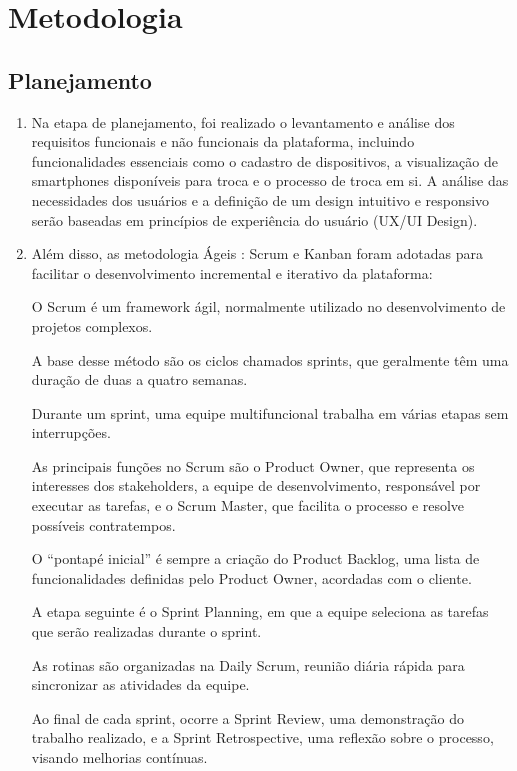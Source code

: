 \chapter{Metodologia}

\section{Planejamento}
\begin{enumerate}
    \item Na etapa de planejamento, foi realizado o levantamento e análise dos requisitos
    funcionais e não funcionais da plataforma, incluindo funcionalidades essenciais como
    o cadastro de dispositivos, a visualização de smartphones disponíveis para troca e o
    processo de troca em si. A análise das necessidades dos usuários e a definição de
    um design intuitivo e responsivo serão baseadas em princípios de experiência do
    usuário (UX/UI Design).

    \item Além disso, as metodologia Ágeis : Scrum e Kanban foram adotadas para facilitar o
    desenvolvimento incremental e iterativo da plataforma: 
        \begin{citacao}
            O Scrum é um framework ágil, normalmente utilizado no desenvolvimento de projetos complexos.

A base desse método são os ciclos chamados sprints, que geralmente têm uma duração de duas a quatro semanas.

Durante um sprint, uma equipe multifuncional trabalha em várias etapas sem interrupções.

As principais funções no Scrum são o Product Owner, que representa os interesses dos stakeholders, a equipe de desenvolvimento, responsável por executar as tarefas, e o Scrum Master, que facilita o processo e resolve possíveis contratempos.

O “pontapé inicial” é sempre a criação do Product Backlog, uma lista de funcionalidades definidas pelo Product Owner, acordadas com o cliente.

A etapa seguinte é o Sprint Planning, em que a equipe seleciona as tarefas que serão realizadas durante o sprint.

As rotinas são organizadas na Daily Scrum, reunião diária rápida para sincronizar as atividades da equipe.

Ao final de cada sprint, ocorre a Sprint Review, uma demonstração do trabalho realizado, e a Sprint Retrospective, uma reflexão sobre o processo, visando melhorias contínuas.


\end{citacao}
\end{enumerate}

